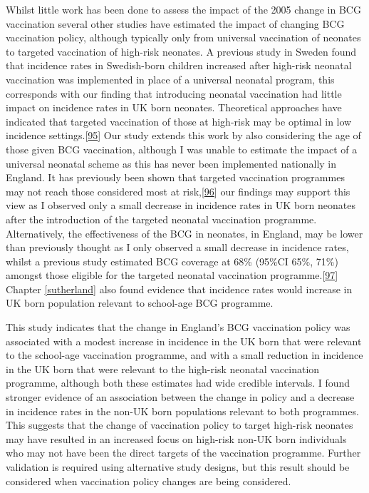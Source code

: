 \documentclass[11pt,twoside]{bristolthesis}
\begin{document}
  Whilst little work has been done to assess the impact of the 2005 change in BCG vaccination several other studies have estimated the impact of changing BCG vaccination policy, although typically only from universal vaccination of neonates to targeted vaccination of high-risk neonates. A previous study in Sweden found that incidence rates in Swedish-born children increased after high-risk neonatal vaccination was implemented in place of a universal neonatal program, this corresponds with our finding that introducing neonatal vaccination had little impact on incidence rates in UK born neonates. Theoretical approaches have indicated that targeted vaccination of those at high-risk may be optimal in low incidence settings.{[}\protect\hyperlink{ref-Manissero2008}{95}{]} Our study extends this work by also considering the age of those given BCG vaccination, although I was unable to estimate the impact of a universal neonatal scheme as this has never been implemented nationally in England. It has previously been shown that targeted vaccination programmes may not reach those considered most at risk,{[}\protect\hyperlink{ref-Feiring2016}{96}{]} our findings may support this view as I observed only a small decrease in incidence rates in UK born neonates after the introduction of the targeted neonatal vaccination programme. Alternatively, the effectiveness of the BCG in neonates, in England, may be lower than previously thought as I only observed a small decrease in incidence rates, whilst a previous study estimated BCG coverage at 68\% (95\%CI 65\%, 71\%) amongst those eligible for the targeted neonatal vaccination programme.{[}\protect\hyperlink{ref-Nguipdop-Djomo2014}{97}{]} Chapter \ref{sutherland} also found evidence that incidence rates would increase in UK born population relevant to school-age BCG programme.
  
  This study indicates that the change in England's BCG vaccination policy was associated with a modest increase in incidence in the UK born that were relevant to the school-age vaccination programme, and with a small reduction in incidence in the UK born that were relevant to the high-risk neonatal vaccination programme, although both these estimates had wide credible intervals. I found stronger evidence of an association between the change in policy and a decrease in incidence rates in the non-UK born populations relevant to both programmes. This suggests that the change of vaccination policy to target high-risk neonates may have resulted in an increased focus on high-risk non-UK born individuals who may not have been the direct targets of the vaccination programme. Further validation is required using alternative study designs, but this result should be considered when vaccination policy changes are being considered.
  
\end{document}
